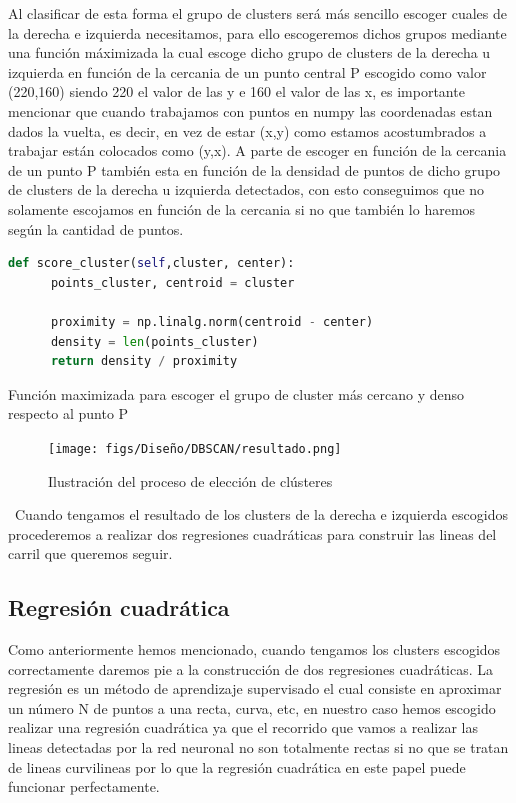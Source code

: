 Al clasificar de esta forma el grupo de clusters será más sencillo escoger cuales de la derecha e izquierda necesitamos, para ello escogeremos dichos grupos mediante una función máximizada
la cual escoge dicho grupo de clusters de la derecha u izquierda en función de la cercania de un punto central P escogido como valor (220,160) siendo 220 el valor de las y e 160 el valor de las x, 
es importante mencionar que cuando trabajamos con puntos en numpy las coordenadas estan dados la vuelta, es decir, en vez de estar (x,y) como estamos acostumbrados a trabajar están colocados
como (y,x). A parte de escoger en función de la cercania de un punto P también esta en función de la densidad de puntos de dicho grupo de clusters de la derecha u izquierda detectados, con
esto conseguimos que no solamente escojamos en función de la cercania si no que también lo haremos según la cantidad de puntos. \newline

\begin{code}[h]
  \begin{lstlisting}[language=Python]
    def score_cluster(self,cluster, center):
      points_cluster, centroid = cluster
    
      proximity = np.linalg.norm(centroid - center)
      density = len(points_cluster)
      return density / proximity

  \end{lstlisting}
  \caption[Función maximizada para escoger el grupo de cluster más cercano y denso respecto al punto P]{Función maximizada para escoger el grupo de cluster más cercano y denso respecto al punto P}
  \label{cod:codejemplo}
  \end{code}  

\begin{figure} [H]
  \begin{center}
    \texttt{[image: figs/Diseño/DBSCAN/resultado.png]}
  \end{center}
  \caption{Ilustración del proceso de elección de clústeres }
  \label{fig:DBSCAN_imagen}
\end{figure}\
Cuando tengamos el resultado de los clusters de la derecha e izquierda escogidos procederemos a realizar dos regresiones cuadráticas para construir las lineas del carril que queremos seguir.
\subsection{Regresión cuadrática}
\label{sec:Regresión cuadrática}
Como anteriormente hemos mencionado, cuando tengamos los clusters escogidos correctamente daremos pie a la construcción de dos regresiones cuadráticas. \newline 
\newline 
La regresión es un método de aprendizaje supervisado el cual consiste en aproximar un número N de puntos a una recta, curva, etc, en nuestro caso hemos escogido realizar una regresión cuadrática ya que el recorrido
que vamos a realizar las lineas detectadas por la red neuronal no son totalmente rectas si no que se tratan de lineas curvilineas por lo que la regresión cuadrática en este papel puede 
funcionar perfectamente. \newline

